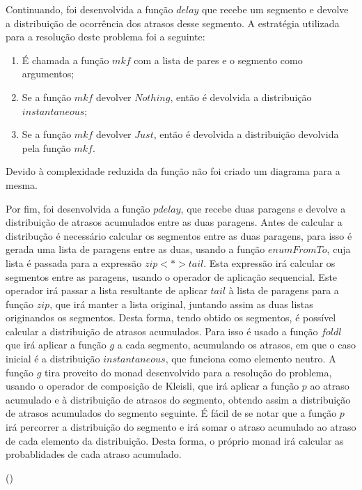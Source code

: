 \documentclass[11pt, a4paper, fleqn]{article}
\newcommand{\Varid}[1]{\mathit{#1}}
\def\resethooks{%
  \global\let\SaveRestoreHook\empty
  \global\let\ColumnHook\empty}
\newcommand{\hsindent}[1]{\quad}%
\let\hspre\empty
\let\hspost\empty
\begin{document}
Continuando, foi desenvolvida a função $delay$ que recebe um segmento e devolve a distribuição de ocorrência dos atrasos desse segmento.
A estratégia utilizada para a resolução deste problema foi a seguinte:
\begin{enumerate}
    \item É chamada a função $mkf$ com a lista de pares e o segmento como argumentos;
    \item Se a função $mkf$ devolver $Nothing$, então é devolvida a distribuição $instantaneous$;
    \item Se a função $mkf$ devolver $Just$, então é devolvida a distribuição devolvida pela função $mkf$. 
\end{enumerate}

Devido à complexidade reduzida da função não foi criado um diagrama para a mesma.\par

Por fim, foi desenvolvida a função $pdelay$, que recebe duas paragens e devolve a distribuição de atrasos acumulados entre as duas paragens. Antes de calcular a distribução é necessário calcular os segmentos entre as duas paragens,
para isso é gerada uma lista de paragens entre as duas, usando a função $enumFromTo$, cuja lista é passada para a expressão $zip <*> tail$. Esta expressão irá calcular os segmentos entre as paragens, usando o operador de aplicação sequencial.
Este operador irá passar a lista resultante de aplicar $tail$ à lista de paragens para a função $zip$, que irá manter a lista original, juntando assim as duas listas originandos os segmentos. Desta forma, tendo obtido os segmentos, 
é possível calcular a distribuição de atrasos acumulados. Para isso é usado a função $foldl$ que irá aplicar a função $g$ a cada segmento, acumulando os atrasos, em que o caso inicial é a distribuição $instantaneous$, que funciona como elemento
neutro. A função $g$ tira proveito do monad desenvolvido para a resolução do problema, usando o operador de composição de Kleisli, que irá aplicar a função $p$ ao atraso acumulado e à distribuição de atrasos do segmento, obtendo assim a
distribuição de atrasos acumulados do segmento seguinte. É fácil de se notar que a função $p$ irá percorrer a distribuição do segmento e irá somar o atraso acumulado ao atraso de cada elemento da distribuição. Desta forma, o próprio monad
irá calcular as probablidades de cada atraso acumulado. 

\begin{hscode}\SaveRestoreHook
\column{B}{@{}>{\hspre}l<{\hspost}@{}}%
\column{5}{@{}>{\hspre}l<{\hspost}@{}}%
\column{E}{@{}>{\hspre}l<{\hspost}@{}}%
\>[B]{}\Varid{db}\mathrel{=}\map \;\conj{\p1\comp \Varid{head}}{\Varid{mkdist}\comp \map \;\p2}\;(\Varid{g}\;\Varid{dados})\;\<[E]%
\\
\>[B]{}\hsindent{5}{}\<[5]%
\>[5]{}\Varid{g}\mathrel{=}\Varid{groupBy}\;\<[E]%
\ColumnHook
\end{hscode}\resethooks
\end{document}
